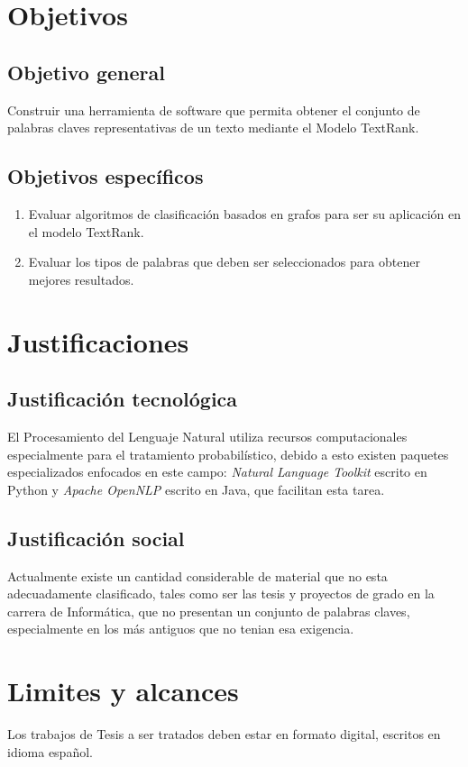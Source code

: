 
\section{Objetivos}

\subsection{Objetivo general}
Construir una herramienta de software que permita obtener el conjunto de palabras claves
representativas de un texto mediante el Modelo TextRank.

\subsection{Objetivos espec\'ificos}
\begin{enumerate}
	\item Evaluar algoritmos de clasificaci\'on basados en grafos para ser su
	aplicaci\'on en el modelo TextRank.
	\item Evaluar los tipos de palabras que deben ser seleccionados para obtener mejores
	resultados.
\end{enumerate}

\section{Justificaciones}
\subsection{Justificaci\'on tecnol\'ogica}
El Procesamiento del Lenguaje Natural utiliza recursos computacionales especialmente
para el tratamiento probabil\'istico, debido a esto existen paquetes especializados
enfocados en este campo: \emph{Natural Language Toolkit} escrito en Python y
\emph{Apache OpenNLP} escrito en Java, que facilitan esta tarea.

\subsection{Justificaci\'on social}
Actualmente existe un cantidad considerable de material que no esta adecuadamente
clasificado, tales como ser las tesis y proyectos de grado en la carrera de 
Inform\'atica, que no presentan un conjunto de palabras claves, especialmente en
los m\'as antiguos que no tenian esa exigencia.



\section{Limites y alcances}
Los trabajos de Tesis a ser tratados deben estar en formato digital, escritos en 
idioma espa\~nol.
